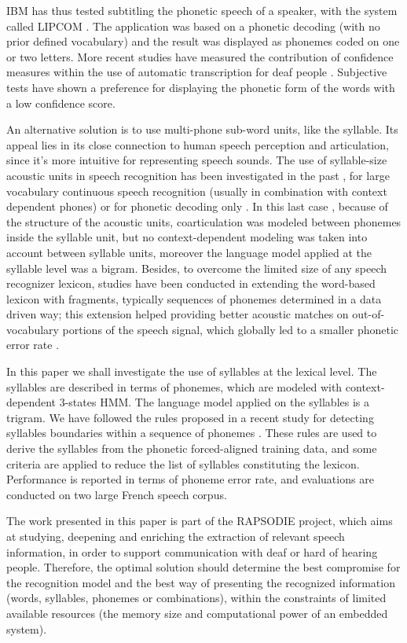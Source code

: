\documentclass[runningheads,a4paper]{llncs}
\begin{document}
IBM has thus tested subtitling the phonetic speech of a speaker, with
the system called LIPCOM \cite{TSD6}. The application was based on
a phonetic decoding (with no prior defined vocabulary) and the result
was displayed as phonemes coded on one or two letters. More recent
studies have measured the contribution of confidence measures \cite{TSD7}
within the use of automatic transcription for deaf people \cite{TSD8}.
Subjective tests have shown a preference for displaying the phonetic
form of the words with a low confidence score. 

An alternative solution is to use multi-phone sub-word units, like
the syllable. Its appeal lies in its close connection to human speech
perception and articulation, since it's more intuitive for representing
speech sounds. The use of syllable-size acoustic units in speech recognition
has been investigated in the past \cite{TSD9,TSD10}, for large vocabulary
continuous speech recognition (usually in combination with context
dependent phones) \cite{TSD11,TSD12} or for phonetic decoding only
\cite{TSD13}. In this last case \cite{TSD13}, because of the structure
of the acoustic units, coarticulation was modeled between phonemes
inside the syllable unit, but no context-dependent modeling was taken
into account between syllable units, moreover the language model applied
at the syllable level was a bigram. Besides, to overcome the limited
size of any speech recognizer lexicon, studies have been conducted
in extending the word-based lexicon with fragments, typically sequences
of phonemes determined in a data driven way; this extension helped
providing better acoustic matches on out-of-vocabulary portions of
the speech signal, which globally led to a smaller phonetic error
rate \cite{TSD14}. 

In this paper we shall investigate the use of syllables at the lexical
level. The syllables are described in terms of phonemes, which are modeled 
with context-dependent 3-states HMM. The language model applied on the syllables 
is a trigram. We have followed the rules proposed in a recent study for 
detecting syllables boundaries within a sequence of phonemes \cite{TSD15}. 
These rules are used to derive the syllables from the phonetic forced-aligned training
data, and some criteria are applied to reduce the list of syllables
constituting the lexicon. Performance is reported in terms of phoneme
error rate, and evaluations are conducted on two large French speech
corpus. 

The work presented in this paper is part of the RAPSODIE project, 
which aims at studying, deepening and enriching the
extraction of relevant speech information, in order to support
communication with deaf or hard of hearing people. Therefore,
the optimal solution should determine the best compromise for
the recognition model and the best way of presenting the recognized
information (words, syllables, phonemes or combinations),
within the constraints of limited available resources (the
memory size and computational power of an embedded system).
\end{document}
